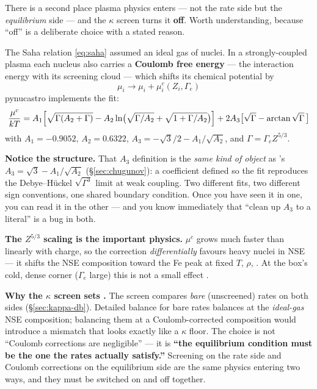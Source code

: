 There is a second place plasma physics enters --- not the rate side but the
\emph{equilibrium} side --- and the $\kappa$ screen turns it \textbf{off}. Worth
understanding, because ``off'' is a deliberate choice with a stated reason.

The Saha relation \eqref{eq:saha} assumed an ideal gas of nuclei. In a
strongly-coupled plasma each nucleus also carries a \textbf{Coulomb free
energy} --- the interaction energy with its screening cloud --- which shifts its
chemical potential by
%
\begin{equation*}
\mu_i \to \mu_i + \mu^c_i(Z_i, \Gamma_e)
\end{equation*}
%
pynucastro implements the \citet[eq.~28]{chabrier1998} fit:
%
\begin{equation*}
\frac{\mu^c}{kT} =
A_1\Bigl[\sqrt{\Gamma(A_2+\Gamma)}
- A_2\ln\bigl(\sqrt{\Gamma/A_2}+\sqrt{1+\Gamma/A_2}\bigr)\Bigr]
+ 2A_3\bigl[\sqrt\Gamma - \arctan\sqrt\Gamma\,\bigr]
\end{equation*}
%
with $A_1 = -0.9052$, $A_2 = 0.6322$,
\textbf{$A_3 = -\sqrt3/2 - A_1/\sqrt{A_2}$}, and
$\Gamma = \Gamma_e Z^{5/3}$.

\begin{aside}
\textbf{Notice the structure.} That $A_3$ definition is the \emph{same kind of
object} as 's $A_3 = \sqrt3 - A_1/\sqrt{A_2}$
(\S\ref{sec:chugunov}): a coefficient defined so the fit reproduces the
Debye--H\"uckel $\sqrt{\Gamma^3}$ limit at weak coupling. Two different fits, two
different sign conventions, one shared boundary condition. Once you have seen it
in one, you can read it in the other --- and you know immediately that ``clean
up $A_3$ to a literal'' is a bug in both.
\end{aside}

\textbf{The $Z^{5/3}$ scaling is the important physics.} $\mu^c$ grows much
faster than linearly with charge, so the correction \emph{differentially}
favours heavy nuclei in NSE --- it shifts the NSE composition toward the Fe peak
at fixed $T$, $\rho$, \Ye. At the box's cold, dense corner ($\Gamma_e$ large)
this is not a small effect \citep[screening factors in the equilibrium reach
${\sim}10^6$ at $\Tn = 3.5$, $\rho = 10^9$\,\gcc]{hix1996}.

\textbf{Why the $\kappa$ screen sets .} The screen
compares \emph{bare} (unscreened) rates on both sides
(\S\ref{sec:kappa-db}). Detailed balance for bare rates balances at the
\emph{ideal-gas} NSE composition; balancing them at a Coulomb-corrected
composition would introduce a mismatch that looks exactly like a $\kappa$ floor.
The choice is not ``Coulomb corrections are negligible'' --- it is
\textbf{``the equilibrium condition must be the one the rates actually
satisfy.''} Screening on the rate side and Coulomb corrections on the
equilibrium side are the same physics entering two ways, and they must be
switched on and off together.

